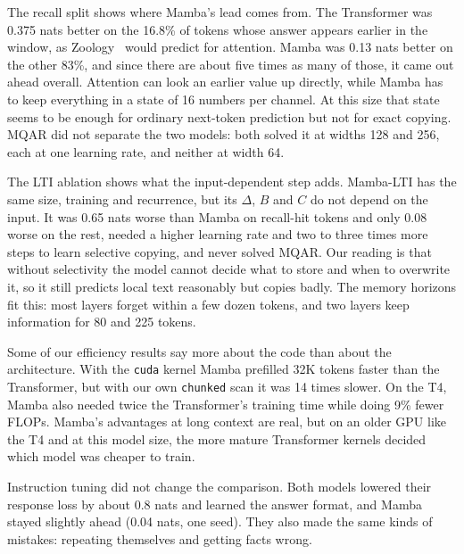 \documentclass[conference]{IEEEtran}
\begin{document}
The recall split shows where Mamba's lead comes from. The Transformer was 0.375 nats better on the
16.8\% of tokens whose answer appears earlier in the window, as Zoology~\cite{arora2023zoology} would
predict for attention. Mamba was 0.13 nats better on the other 83\%, and since there are about five
times as many of those, it came out ahead overall. Attention can look an earlier value up directly,
while Mamba has to keep everything in a state of 16 numbers per channel. At this size that state seems
to be enough for ordinary next-token prediction but not for exact copying. MQAR did not separate the
two models: both solved it at widths 128 and 256, each at one learning rate, and neither at width 64.

The LTI ablation shows what the input-dependent step adds. Mamba-LTI has the same size, training and
recurrence, but its $\Delta$, $B$ and $C$ do not depend on the input. It was 0.65 nats worse than Mamba
on recall-hit tokens and only 0.08 worse on the rest, needed a higher learning rate and two to three
times more steps to learn selective copying, and never solved MQAR. Our reading is that without
selectivity the model cannot decide what to store and when to overwrite it, so it still predicts local
text reasonably but copies badly. The memory horizons fit this: most layers forget within a few dozen
tokens, and two layers keep information for 80 and 225 tokens.

Some of our efficiency results say more about the code than about the architecture. With the
\texttt{cuda} kernel Mamba prefilled 32K tokens faster than the Transformer, but with our own
\texttt{chunked} scan it was 14 times slower. On the T4, Mamba also needed twice the Transformer's
training time while doing 9\% fewer FLOPs. Mamba's advantages at long context are real, but on an older
GPU like the T4 and at this model size, the more mature Transformer kernels decided which model was
cheaper to train.

Instruction tuning did not change the comparison. Both models lowered their response loss by about 0.8
nats and learned the answer format, and Mamba stayed slightly ahead (0.04 nats, one seed). They also
made the same kinds of mistakes: repeating themselves and getting facts wrong.
\end{document}
